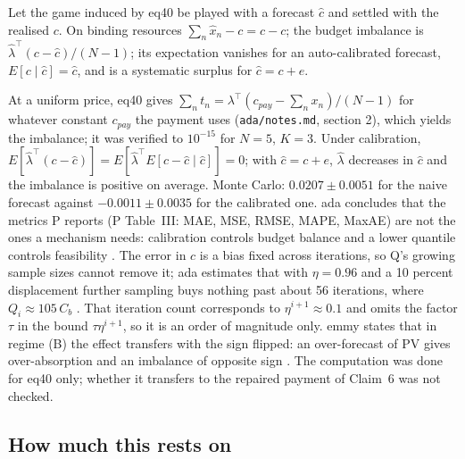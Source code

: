 \documentclass{article}
\begin{document}
\begin{claim}
Let the game induced by eq40 be played with a forecast \(\hat c\) and settled with the realised \(c\). On binding resources \(\sum_n\hat x_n-c=\hat c-c\); the budget imbalance is \(\hat\lambda^\top(c-\hat c)/(N-1)\); its expectation vanishes for an auto-calibrated forecast, \(E[c\mid\hat c]=\hat c\), and is a systematic surplus for \(\hat c=c+e\). 
\end{claim}

At a uniform price, eq40 gives \(\sum_nt_n=\lambda^\top(c_{pay}-\sum_nx_n)/(N-1)\) for whatever constant \(c_{pay}\) the payment uses (\texttt{ada/notes.md}, section 2), which yields the imbalance; it was verified to \(10^{-15}\) for \(N=5\), \(K=3\). Under calibration, \(E[\hat\lambda^\top(c-\hat c)]=E[\hat\lambda^\top E[c-\hat c\mid\hat c]]=0\); with \(\hat c=c+e\), \(\hat\lambda\) decreases in \(\hat c\) and the imbalance is positive on average. Monte Carlo: \(0.0207\pm0.0051\) for the naive forecast against \(-0.0011\pm0.0035\) for the calibrated one. ada concludes that the metrics P reports (P Table~III: MAE, MSE, RMSE, MAPE, MaxAE) are not the ones a mechanism needs: calibration controls budget balance and a lower quantile controls feasibility . The error in \(c\) is a bias fixed across iterations, so Q's growing sample sizes cannot remove it; ada estimates that with \(\eta=0.96\) and a 10 percent displacement further sampling buys nothing past about 56 iterations, where \(Q_i\approx105\,C_b\) . That iteration count corresponds to \(\eta^{i+1}\approx0.1\) and omits the factor \(\tau\) in the bound \(\tau\eta^{i+1}\), so it is an order of magnitude only. emmy states that in regime (B) the effect transfers with the sign flipped: an over-forecast of PV gives over-absorption and an imbalance of opposite sign . The computation was done for eq40 only; whether it transfers to the repaired payment of Claim~6 was not checked.

\subsection{How much this rests on}
\end{document}
